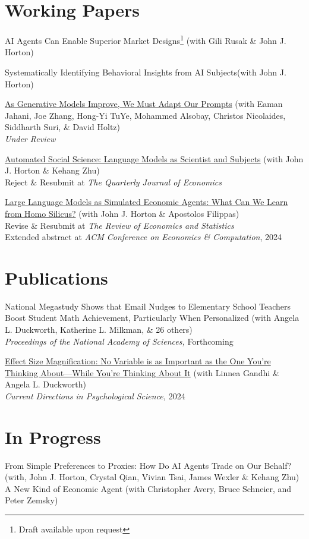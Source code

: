 \documentclass[margin,line,pifont,palatino,courier, 9pt]{res}
\begin{document}
\begin{resume}
\section{\sc Working Papers}

AI Agents Can Enable Superior Market Designs\footnote{Draft available upon request} (with Gili Rusak \& John J. Horton)

Systematically Identifying Behavioral Insights from AI Subjects\footnotemark[\value{footnote}] (with John J. Horton)

\href{https://arxiv.org/abs/2407.14333}{As Generative Models Improve, We Must Adapt Our Prompts} (with Eaman Jahani, Joe Zhang, Hong-Yi TuYe, Mohammed Alsobay, Christos Nicolaides, Siddharth
Suri, \& David Holtz)\\
\textit{Under Review}

\href{https://www.nber.org/papers/w32381}{Automated Social Science: Language Models as Scientist and Subjects} (with John J. Horton \& Kehang Zhu)\\
Reject \& Resubmit at \textit{The Quarterly Journal of Economics}

\href{https://www.nber.org/papers/w31122}{Large Language Models as Simulated Economic Agents: What Can We Learn from Homo Silicus?} (with John J. Horton \& Apostolos Filippas)\\
Revise \& Resubmit at \textit{The Review of Economics and Statistics}\\
Extended abstract at \textit{ACM Conference on Economics \& Computation}, 2024


\section{\sc Publications}
National Megastudy Shows that Email Nudges to Elementary School Teachers Boost Student Math Achievement, Particularly When Personalized 
(with Angela L. Duckworth, Katherine L. Milkman, \& 26 others)\\
\textit{Proceedings of the National Academy of Sciences,} Forthcoming

\href{https://journals.sagepub.com/doi/full/10.1177/09637214241268222}{Effect Size Magnification: No Variable is as Important as the One You're Thinking About---While You're Thinking About It} (with Linnea Gandhi \& Angela L. Duckworth)\\
\textit{Current Directions in Psychological Science,} 2024

\section{\sc In Progress}
From Simple Preferences to Proxies: How Do AI Agents Trade on Our Behalf?
(with, John J. Horton, Crystal Qian, Vivian Tsai, James Wexler \& Kehang Zhu)\\
A New Kind of Economic Agent
(with Christopher Avery, Bruce Schneier, and Peter Zemsky)


\end{resume}
\end{document}
